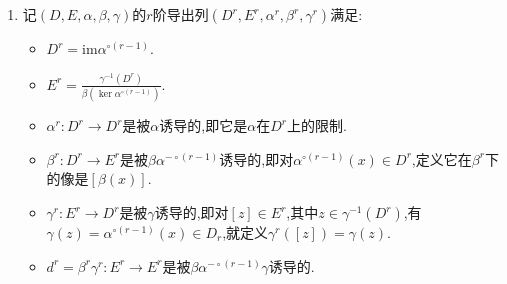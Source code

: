 \begin{enumerate}
	原正合对视为1阶导出对,它的导出对视为2阶导出对,归纳的定义$r$阶导出对.那么$(E^r,d^r)$是微分对象,这个序列称为正合对$(D,E,\alpha,\beta,\gamma)$诱导的谱序列.
	$$\xymatrix{D\ar[rr]_{\alpha}^{(a,a')}&&D\ar[dl]_{\beta}^{(b,b')}\\&E\ar[ul]_{\gamma}^{(c,c')}&}\qquad\xymatrix{D^2\ar[rr]_{\alpha^2}^{(a,a')}&&D^2\ar[dl]_{\beta^2}^{(b-a.b'-a')}\\&E^2\ar[ul]_{\gamma^2}^{(c,c')}&}$$
	\item 记$(D,E,\alpha,\beta,\gamma)$的$r$阶导出列$(D^r,E^r,\alpha^r,\beta^r,\gamma^r)$满足:
	\begin{itemize}
		\item $D^r=\mathrm{im}\alpha^{\circ(r-1)}$.
		\item $E^r=\frac{\gamma^{-1}(D^r)}{\beta(\ker\alpha^{\circ(r-1)})}$.
		\item $\alpha^r:D^r\to D^r$是被$\alpha$诱导的,即它是$\alpha$在$D^r$上的限制.
		\item $\beta^r:D^r\to E^r$是被$\beta\alpha^{-\circ(r-1)}$诱导的,即对$\alpha^{\circ(r-1)}(x)\in D^r$,定义它在$\beta^r$下的像是$[\beta(x)]$.
		\item $\gamma^r:E^r\to D^r$是被$\gamma$诱导的,即对$[z]\in E^r$,其中$z\in\gamma^{-1}(D^r)$,有$\gamma(z)=\alpha^{\circ(r-1)}(x)\in D_r$,就定义$\gamma^r([z])=\gamma(z)$.
		\item $d^r=\beta^r\gamma^r:E^r\to E^r$是被$\beta\alpha^{-\circ(r-1)}\gamma$诱导的.
	\end{itemize}
\end{enumerate}

